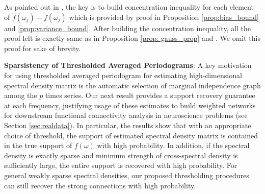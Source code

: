 As pointed out in \citet{rothman2009generalized}, the key is to build concentration inequality for each element of  $\hat{f}(\omega_j)-f(\omega_j)$ which is provided by proof in  Proposition \ref{prop:bias_bound} and \ref{prop:variance_bound}. After building the concentration inequality, all the proof left is exactly same as in Proposition \ref{prop: gauss_prop} and \citet{rothman2009generalized}. We omit this proof for sake of brevity.

\smallskip

\noindent \textbf{Sparsistency of Thresholded Averaged Periodograms}: A key motivation for using thresholded averaged periodogram for estimating high-dimensional spectral density matrix is the automatic selection of marginal independence graph among the $p$ times series. Our next result provides a support recovery guarantee at each frequency, justifying usage of these estimates to build weighted networks for downstream functional connectivity analysis in neuroscience problems (see Section \ref{sec:realdata}). In particular, the results show that with an appropriate choice of threshold, the support of estimated spectral density matrix is contained in the true support of $f(\omega)$ with high probability. In addition, if the spectral density is exactly sparse and minimum strength of cross-spectral density is sufficiently large, the entire support is recovered with high probability. For general weakly sparse spectral densities, our proposed thresholding procedures can still recover the strong connections with high probability.


